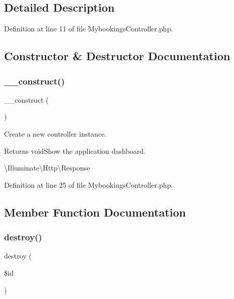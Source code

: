 \subsection{Detailed Description}


Definition at line 11 of file Mybookings\+Controller.\+php.



\subsection{Constructor \& Destructor Documentation}
\mbox{\label{class_responsive_1_1_http_1_1_controllers_1_1_mybookings_controller_a095c5d389db211932136b53f25f39685}} 
\subsubsection{\texorpdfstring{\_\_construct()}{\_\_construct()}}
{\footnotesize\ttfamily \+\_\+\+\_\+construct (\begin{DoxyParamCaption}{ }\end{DoxyParamCaption})}

Create a new controller instance.

\begin{DoxyReturn}{Returns}
void\+Show the application dashboard.

\textbackslash{}\+Illuminate\textbackslash{}\+Http\textbackslash{}\+Response 
\end{DoxyReturn}


Definition at line 25 of file Mybookings\+Controller.\+php.



\subsection{Member Function Documentation}
\mbox{\label{class_responsive_1_1_http_1_1_controllers_1_1_mybookings_controller_a726fa8a4b4b187b9ca32ba427aac8137}} 
\subsubsection{\texorpdfstring{destroy()}{destroy()}}
{\footnotesize\ttfamily destroy (\begin{DoxyParamCaption}\item[{}]{\$id }\end{DoxyParamCaption})}



